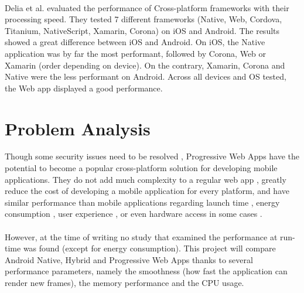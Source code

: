 \documentclass{kththesis}
\begin{document}
\paragraph{}
Delia et al. \cite{delia2017approaches} evaluated the performance of Cross-platform frameworks with their processing speed. They tested 7 different frameworks (Native, Web, Cordova, Titanium, NativeScript, Xamarin, Corona) on iOS and Android. The results showed a great difference between iOS and Android. On iOS, the Native application was by far the most performant, followed by Corona, Web or Xamarin (order depending on device). On the contrary, Xamarin, Corona and Native were the less performant on Android. Across all devices and OS tested, the Web app displayed a good performance. 


\section{Problem Analysis}


Though some security issues need to be resolved \cite{Pride_Prejudice}, Progressive Web Apps have the potential to become a popular cross-platform solution for developing mobile applications. They do not add much complexity to a regular web app \cite{JohannsenFabian2018PWAa}, greatly reduce the cost of developing a mobile application for every platform, and have similar performance than mobile applications regarding launch time \cite{PWApossibleUnifer}\cite{Biorn-Hansen2} \cite{PWAapplicability}, energy consumption \cite{PWAapplicability}, user experience \cite{emulating_native_w_crossplatform}\cite{PWA_UX_comparison_study}, or even hardware access in some cases \cite{PWAbc_responsetime}. 
\paragraph{}

However, at the time of writing no study that examined the performance at run-time was found (except for energy consumption). This project will compare Android Native, Hybrid and Progressive Web Apps thanks to  several performance parameters, namely the smoothness (how fast the application can render new frames), the memory performance and the CPU usage. 
\end{document}
